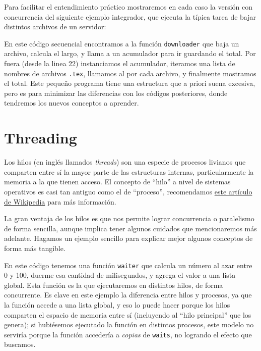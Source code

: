 Para facilitar el entendimiento práctico mostraremos en cada caso la versión con concurrencia del siguiente ejemplo integrador, que ejecuta la típica tarea de bajar distintos archivos de un servidor:


En este código secuencial encontramos a la función \texttt{downloader} que baja un archivo, calcula el largo, y llama a un acumulador para ir guardando el total. Por fuera (desde la linea 22) instanciamos el acumulador, iteramos una lista de nombres de archivos \texttt{.tex}, llamamos al  por cada archivo, y finalmente mostramos el total. Este pequeño programa tiene una estructura que a priori suena excesiva, pero es para minimizar las diferencias con los códigos posteriores, donde tendremos los nuevos conceptos a aprender.



\section{Threading}\label{sec:multithreading}

Los hilos (en inglés llamados \textit{threads}) son una especie de procesos livianos que comparten entre sí la mayor parte de las estructuras internas, particularmente la memoria a la que tienen acceso. El concepto de ``hilo'' a nivel de sistemas operativos es casi tan antiguo como el de ``proceso'', recomendamos \href{https://es.wikipedia.org/wiki/Hilo_(inform%%C3%%A1tica)}{este artículo de Wikipedia} para más información.

La gran ventaja de los hilos es que nos permite lograr concurrencia o paralelismo de forma sencilla, aunque implica tener algunos cuidados que mencionaremos más adelante. Hagamos un ejemplo sencillo para explicar mejor algunos conceptos de forma más tangible.


En este código tenemos una función \texttt{waiter} que calcula un número al azar entre 0 y 100, duerme esa cantidad de milisegundos, y agrega el valor a una lista global. Esta función es la que ejecutaremos en distintos hilos, de forma concurrente. Es clave en este ejemplo la diferencia entre hilos y procesos, ya que la función accede a una lista global, y eso lo puede hacer porque los hilos comparten el espacio de memoria entre sí (incluyendo al ``hilo principal'' que los genera); si hubiésemos ejecutado la función en distintos procesos, este modelo no serviría porque la función accedería a \textit{copias} de \texttt{waits}, no logrando el efecto que buscamos.

